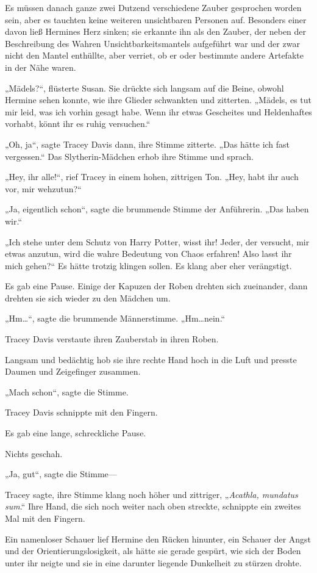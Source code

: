 {Es müssen danach ganze zwei Dutzend verschiedene Zauber gesprochen worden sein, aber es tauchten keine weiteren unsichtbaren Personen auf. Besonders einer davon ließ Hermines Herz sinken; sie erkannte ihn als den Zauber, der neben der Beschreibung des Wahren Unsichtbarkeitsmantels aufgeführt war und der zwar nicht den Mantel enthüllte, aber verriet, ob er oder bestimmte andere Artefakte in der Nähe waren.

„Mädels?“, flüsterte Susan. Sie drückte sich langsam auf die Beine, obwohl Hermine sehen konnte, wie ihre Glieder schwankten und zitterten. „Mädels, es tut mir leid, was ich vorhin gesagt habe. Wenn ihr etwas Gescheites und Heldenhaftes vorhabt, könnt ihr es ruhig versuchen.“

„Oh, ja“, sagte Tracey Davis dann, ihre Stimme zitterte. „Das hätte ich fast vergessen.“ Das Slytherin-Mädchen erhob ihre Stimme und sprach.

„Hey, ihr alle!“, rief Tracey in einem hohen, zittrigen Ton. „Hey, habt ihr auch vor, mir wehzutun?“

„Ja, eigentlich schon“, sagte die brummende Stimme der Anführerin. „Das haben wir.“

„Ich stehe unter dem Schutz von Harry Potter, wisst ihr! Jeder, der versucht, mir etwas anzutun, wird die wahre Bedeutung von Chaos erfahren! Also lasst ihr mich gehen?“ Es hätte trotzig klingen sollen. Es klang aber eher verängstigt.

Es gab eine Pause. Einige der Kapuzen der Roben drehten sich zueinander, dann drehten sie sich wieder zu den Mädchen um.

„Hm…“, sagte die brummende Männerstimme. „Hm…nein.“

Tracey Davis verstaute ihren Zauberstab in ihren Roben.

Langsam und bedächtig hob sie ihre rechte Hand hoch in die Luft und presste Daumen und Zeigefinger zusammen.

„Mach schon“, sagte die Stimme.

Tracey Davis schnippte mit den Fingern.

Es gab eine lange, schreckliche Pause.

Nichts geschah.

„Ja, gut“, sagte die Stimme—

Tracey sagte, ihre Stimme klang noch höher und zittriger, „\emph{Acathla, mundatus sum}.“ Ihre Hand, die sich noch weiter nach oben streckte, schnippte ein zweites Mal mit den Fingern.

Ein namenloser Schauer lief Hermine den Rücken hinunter, ein Schauer der Angst und der Orientierungslosigkeit, als hätte sie gerade gespürt, wie sich der Boden unter ihr neigte und sie in eine darunter liegende Dunkelheit zu stürzen drohte.

}
